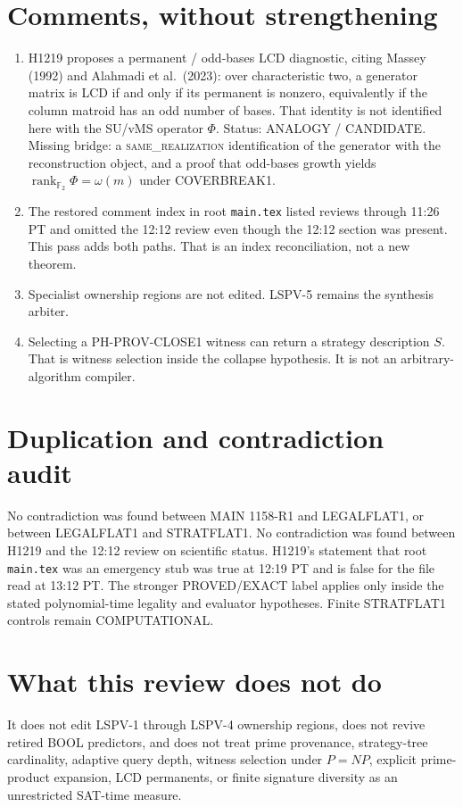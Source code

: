 \documentclass[11pt]{article}
\begin{document}
\section*{Comments, without strengthening}
\begin{enumerate}
\item H1219 proposes a permanent / odd-bases LCD diagnostic, citing Massey (1992) and Alahmadi et al.\
(2023): over characteristic two, a generator matrix is LCD if and only if its permanent is nonzero,
equivalently if the column matroid has an odd number of bases. That identity is not identified here
with the SU/vMS operator \(\Phi\). Status: ANALOGY / CANDIDATE. Missing bridge: a
\textsc{same\_realization} identification of the generator with the reconstruction object, and a proof
that odd-bases growth yields \(\operatorname{rank}_{\mathbb F_2}\Phi=\omega(m)\) under COVERBREAK1.
\item The restored comment index in root \texttt{main.tex} listed reviews through 11:26 PT and omitted
the 12:12 review even though the 12:12 section was present. This pass adds both paths. That is an
index reconciliation, not a new theorem.
\item Specialist ownership regions are not edited. LSPV-5 remains the synthesis arbiter.
\item Selecting a PH-PROV-CLOSE1 witness can return a strategy description \(S\). That is witness
selection inside the collapse hypothesis. It is not an arbitrary-algorithm compiler.
\end{enumerate}

\section*{Duplication and contradiction audit}
No contradiction was found between MAIN 1158-R1 and LEGALFLAT1, or between LEGALFLAT1 and
STRATFLAT1. No contradiction was found between H1219 and the 12:12 review on scientific status.
H1219's statement that root \texttt{main.tex} was an emergency stub was true at 12:19 PT and is
false for the file read at 13:12 PT. The stronger PROVED/EXACT label applies only inside the stated
polynomial-time legality and evaluator hypotheses. Finite STRATFLAT1 controls remain COMPUTATIONAL.

\section*{What this review does not do}
It does not edit LSPV-1 through LSPV-4 ownership regions, does not revive retired BOOL predictors,
and does not treat prime provenance, strategy-tree cardinality, adaptive query depth, witness
selection under \(P=NP\), explicit prime-product expansion, LCD permanents, or finite signature
diversity as an unrestricted SAT-time measure.
\end{document}
